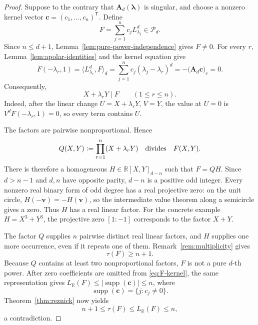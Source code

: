 \documentclass[10pt,a4paper]{amsart}
\newcommand{\LR}{L_{\RR}}
\newcommand{\Mat}[1]{\mathbf{#1}}
\newcommand{\RR}{\mathbb{R}}
\newcommand{\cP}{\mathcal{P}}
\newcommand{\defeq}{\mathrel{\vcentcolon=}}
\newcommand{\vct}[1]{\boldsymbol{#1}}
\begin{document}
\begin{proof}
Suppose to the contrary that \(\Mat{A}_d(\vct{\lambda})\) is singular,
and choose a nonzero kernel vector
\(\vct{c}=(c_1,\ldots,c_n)^{\mathsf T}\).  Define
\begin{equation}\label{eq:F-kernel}
 F=\sum_{j=1}^n c_jL_{\lambda_j}^d\in\cP_d.
\end{equation}
Since \(n\le d+1\), Lemma~\ref{lem:pure-power-independence} gives
\(F\ne0\).  For every \(r\), Lemma~\ref{lem:apolar-identities} and the
kernel equation give
\[
 F(-\lambda_r,1)
 =\langle L_{\lambda_r}^d,F\rangle_d
 =\sum_{j=1}^n c_j(\lambda_j-\lambda_r)^d
 =-\bigl(\Mat{A}_d\vct{c}\bigr)_r=0.
\]
Consequently,
\[
 X+\lambda_rY\mid F
 \qquad(1\le r\le n).
\]
Indeed, after the linear change \(U=X+\lambda_rY\), \(V=Y\), the value
at \(U=0\) is \(V^dF(-\lambda_r,1)=0\), so every term contains \(U\).

The factors are pairwise nonproportional.  Hence
\begin{equation}\label{eq:Q-divides-F}
 Q(X,Y)\defeq\prod_{r=1}^n(X+\lambda_rY)
 \quad\text{divides}\quad F(X,Y).
\end{equation}
There is therefore a homogeneous \(H\in\RR[X,Y]_{d-n}\) such that
\(F=QH\).  Since \(d>n-1\) and \(d,n\) have opposite parity,
\(d-n\) is a positive odd integer.  Every nonzero real binary form of
odd degree has a real projective zero: on the unit circle,
\(H(-\vct v)=-H(\vct v)\), so the intermediate value theorem along a
semicircle gives a zero.  Thus \(H\) has a real linear factor.
For the concrete example \(H=X^3+Y^3\), the projective zero
\([1:-1]\) corresponds to the factor \(X+Y\).

The factor \(Q\) supplies \(n\) pairwise distinct real linear factors,
and \(H\) supplies one more occurrence, even if it repeats one of them.
Remark~\ref{rem:multiplicity} gives
\begin{equation}\label{eq:tau-lower}
 \tau(F)\ge n+1.
\end{equation}
Because \(Q\) contains at least two nonproportional factors, \(F\) is
not a pure \(d\)-th power.  After zero coefficients are omitted from
\eqref{eq:F-kernel}, the same representation gives
\(\LR(F)\le |\operatorname{supp}(\vct c)|\le n\), where
\[
 \operatorname{supp}(\vct c)=\{j:c_j\ne0\}.
\]
Theorem~\ref{thm:reznick} now yields
\[
 n+1\le\tau(F)\le\LR(F)\le n,
\]
a contradiction.
\end{proof}
\end{document}

